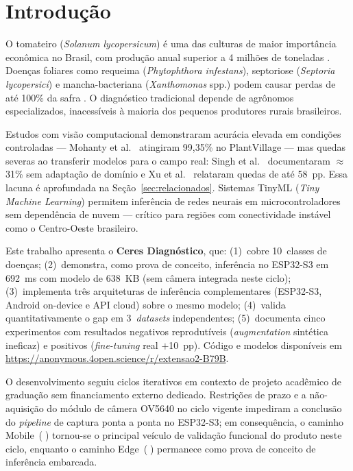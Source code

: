 \documentclass[12pt]{article}
\newcommand{\circled}[1]{\textcircled{\raisebox{-0.5pt}{\small #1}}}
\begin{document}
\section{Introdução}

O tomateiro (\textit{Solanum lycopersicum}) é uma das culturas de maior importância
econômica no Brasil, com produção anual superior a 4 milhões de toneladas
\cite{fao2024}. Doenças foliares como requeima (\textit{Phytophthora infestans}),
septoriose (\textit{Septoria lycopersici}) e mancha-bacteriana (\textit{Xanthomonas}
spp.) podem causar perdas de até 100\% da safra \cite{embrapa2023}. O diagnóstico
tradicional depende de agrônomos especializados, inacessíveis à maioria dos pequenos
produtores rurais brasileiros.

Estudos com visão computacional demonstraram acurácia elevada em condições
controladas --- Mohanty et al.~\cite{mohanty2016} atingiram 99,35\% no PlantVillage
--- mas quedas severas ao transferir modelos para o campo real: Singh et
al.~\cite{singh2020} documentaram $\approx$31\% sem adaptação de domínio e Xu et
al.~\cite{xu2024} relataram quedas de até 58~pp. Essa lacuna é aprofundada na
Seção~\ref{sec:relacionados}. Sistemas TinyML (\textit{Tiny Machine Learning})
permitem inferência de redes neurais em microcontroladores sem dependência de nuvem
\cite{warden2019} --- crítico para regiões com conectividade instável como o
Centro-Oeste brasileiro.

Este trabalho apresenta o \textbf{Ceres Diagnóstico}, que: (1)~cobre 10~classes de
doenças; (2)~demonstra, como prova de conceito, inferência no ESP32-S3 em 692~ms
com modelo de 638~KB (sem câmera integrada neste ciclo);
(3)~implementa três arquiteturas de inferência complementares (ESP32-S3, Android
on-device e API cloud) sobre o mesmo modelo; (4)~valida quantitativamente o gap em
3~\textit{datasets} independentes; (5)~documenta cinco experimentos com resultados
negativos reprodutíveis (\textit{augmentation} sintética ineficaz) e positivos
(\textit{fine-tuning} real $+$10~pp). Código e modelos disponíveis em
\url{https://anonymous.4open.science/r/extensao2-B79B}.

O desenvolvimento seguiu ciclos iterativos em contexto de projeto acadêmico de
graduação sem financiamento externo dedicado. Restrições de prazo e a não-aquisição do módulo de câmera
OV5640 no ciclo vigente impediram a conclusão do \textit{pipeline} de captura
ponta a ponta no ESP32-S3; em consequência, o caminho Mobile~(\circled{2})
tornou-se o principal veículo de validação funcional do produto neste ciclo,
enquanto o caminho Edge~(\circled{1}) permanece como prova de conceito de
inferência embarcada.
\end{document}
